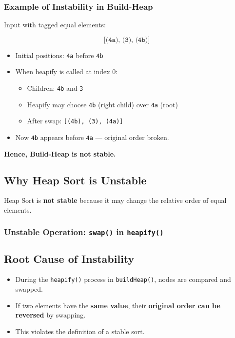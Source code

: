 \documentclass[14pt]{extarticle}
\begin{document}
\subsubsection*{Example of Instability in Build-Heap}

Input with tagged equal elements:

\[
\texttt{[(4a), (3), (4b)]}
\]

\begin{itemize}
    \item Initial positions: \texttt{4a} before \texttt{4b}
    \item When heapify is called at index 0:
        \begin{itemize}
            \item Children: \texttt{4b} and \texttt{3}
            \item Heapify may choose \texttt{4b} (right child) over \texttt{4a} (root)
            \item After swap: \texttt{[(4b), (3), (4a)]}
        \end{itemize}
    \item Now \texttt{4b} appears before \texttt{4a} — original order broken.
\end{itemize}

\textbf{Hence, Build-Heap is not stable.}

\subsection*{Why Heap Sort is Unstable}

Heap Sort is \textbf{not stable} because it may change the relative order of equal elements.

\subsubsection*{Unstable Operation: \texttt{swap()} in \texttt{heapify()}}

\subsection*{Root Cause of Instability}
\begin{itemize}
    \item During the \texttt{heapify()} process in \texttt{buildHeap()}, nodes are compared and swapped.
    \item If two elements have the \textbf{same value}, their \textbf{original order can be reversed} by swapping.
    \item This violates the definition of a stable sort.
\end{itemize}
\newpage
\end{document}
